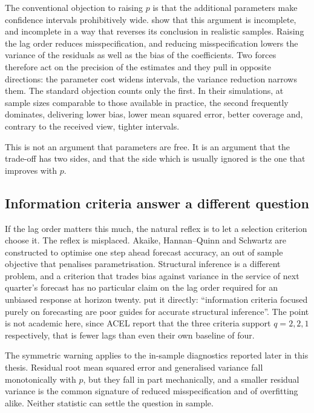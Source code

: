 The conventional objection to raising $p$ is that the additional parameters make confidence
intervals prohibitively wide. \citet{Long_Lag2025} show that this argument is incomplete, and
incomplete in a way that reverses its conclusion in realistic samples. Raising the lag order
reduces misspecification, and reducing misspecification lowers the variance of the residuals as
well as the bias of the coefficients. Two forces therefore act on the precision of the
estimates and they pull in opposite directions: the parameter cost widens intervals, the
variance reduction narrows them. The standard objection counts only the first. In their
simulations, at sample sizes comparable to those available in practice, the second frequently
dominates, delivering lower bias, lower mean squared error, better coverage and, contrary to
the received view, tighter intervals.

This is not an argument that parameters are free. It is an argument that the trade-off has two
sides, and that the side which is usually ignored is the one that improves with $p$.

\subsection{Information criteria answer a different question}
\label{sec:modelselection}

If the lag order matters this much, the natural reflex is to let a selection criterion choose
it. The reflex is misplaced. Akaike, Hannan--Quinn and Schwartz are constructed to optimise one
step ahead forecast accuracy, an out of sample objective that penalises parametrisation.
Structural inference is a different problem, and a criterion that trades bias against variance
in the service of next quarter's forecast has no particular claim on the lag order required for
an unbiased response at horizon twenty. \citet{Long_Lag2025} put it directly: ``information
criteria focused purely on forecasting are poor guides for accurate structural inference''.
The point is not academic here, since ACEL report that the three criteria support $q = 2, 2, 1$
respectively, that is fewer lags than even their own baseline of four.

The symmetric warning applies to the in-sample diagnostics reported later in this thesis.
Residual root mean squared error and generalised variance fall monotonically with $p$, but they
fall in part mechanically, and a smaller residual variance is the common signature of reduced
misspecification and of overfitting alike. Neither statistic can settle the question in sample.

